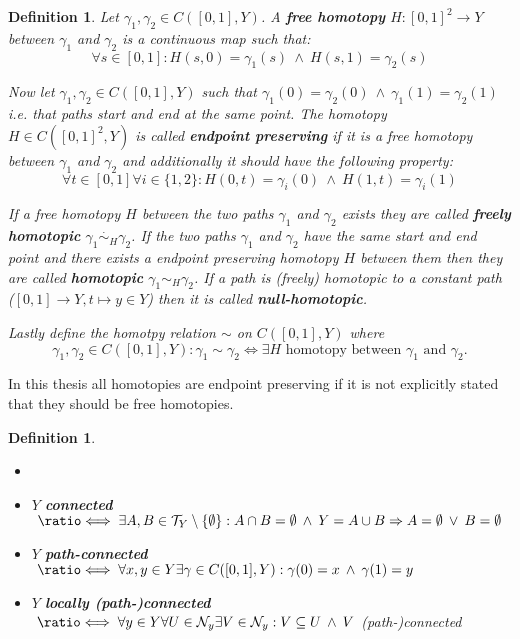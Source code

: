 \documentclass{article}
\newcommand{\T}[0]{\mathcal{T}}
\newcommand{\NB}[0]{\mathcal{N}}
\newcommand*{\longeq}{\ratio\Longleftrightarrow}
\theoremstyle{break}
\theoremstyle{break}
\newtheorem{defin}[thm]{Definition}
\begin{document}
\begin{defin}
  Let $\gamma_1, \gamma_2 \in C([0, 1], Y)$. A \textbf{free homotopy} $H: [0,1]^2 \to Y$ between $\gamma_1$ and $\gamma_2$ is a continuous map such that:
  \begin{equation*}
    \forall s \in [0,1]: H(s, 0) = \gamma_1(s) \: \land \: H(s, 1) = \gamma_2(s)
  \end{equation*}

  Now let $\gamma_1, \gamma_2 \in C([0, 1], Y)$ such that $\gamma_1(0) = \gamma_2(0) \: \land \: \gamma_1(1) = \gamma_2(1)$ i.e. that paths start and end at the same point.
  The homotopy $H \in C([0,1]^2, Y)$ is called \textbf{endpoint preserving} if it is a free homotopy between $\gamma_1$ and $\gamma_2$ and additionally it should have the following property: 
  \begin{equation*}
    \forall t\in[0,1]\forall i\in \{1,2\}: H(0, t) = \gamma_i(0) \: \land \: H(1, t) = \gamma_i(1)
  \end{equation*}

  If a free homotopy $H$ between the two paths $\gamma_1$ and $\gamma_2$ exists they are called \textbf{freely homotopic} $\gamma_1 \overset{\cdot}{\sim}_H \gamma_2$.
  If the two paths $\gamma_1$ and $\gamma_2$ have the same start and end point and there exists a endpoint preserving homotopy $H$ between them then they are called 
  \textbf{homotopic} $\gamma_1 \sim_H \gamma_2$. If a path is (freely) homotopic to a constant path ($[0,1] \to Y, t \mapsto y \in Y$) then it is called \textbf{null-homotopic}.

  Lastly define the homotpy relation $\sim$ on $C([0,1], Y)$ where 
  \begin{equation*}
    \gamma_1, \gamma_2 \in C([0,1], Y): \gamma_1 \sim \gamma_2 \iff \exists H \text{ homotopy between } \gamma_1 \text{ and } \gamma_2.
  \end{equation*}
\end{defin}

In this thesis all homotopies are endpoint preserving if it is not explicitly stated that they should be free homotopies.

\begin{defin} \label{def:connectedness}
  \begin{itemize}
    \item[] %
    \item $Y$ \textbf{connected} $\;\longeq\; \exists A,B \in \T_Y\setminus \{\emptyset\}: A \cap B = \emptyset \: \land \: Y = A \cup B \Rightarrow A = \emptyset \: \lor \: B = \emptyset$
    \item $Y$ \textbf{path-connected} $\;\longeq\; \forall x,y \in Y \exists\gamma \in C([0,1], Y): \gamma(0) = x \: \land \: \gamma(1) = y$
    \item $Y$ \textbf{locally (path-)connected} $\;\longeq\; \forall y \in Y\forall U \in \NB_y\exists V\in \NB_y: V \subseteq U \: \land \: V$ (path-)connected
  \end{itemize}
\end{defin}
\end{document}
